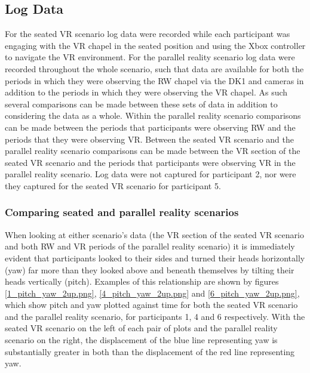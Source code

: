 
\subsection{Log Data}

For the seated VR scenario log data were recorded while each participant was engaging with the VR chapel in the seated position and using the Xbox controller to navigate the VR environment. For the parallel reality scenario log data were recorded throughout the whole scenario, such that data are available for both the periods in which they were observing the RW chapel via the DK1 and cameras in addition to the periods in which they were observing the VR chapel. As such several comparisons can be made between these sets of data in addition to considering the data as a whole. Within the parallel reality scenario comparisons can be made between the periods that participants were observing RW and the periods that they were observing VR. Between the seated VR scenario and the parallel reality scenario comparisons can be made between the VR section of the seated VR scenario and the periods that participants were observing VR in the parallel reality scenario. Log data were not captured for participant 2, nor were they captured for the seated VR scenario for participant 5.


\subsubsection{Comparing seated and parallel reality scenarios}

When looking at either scenario's data (the VR section of the seated VR scenario and both RW and VR periods of the parallel reality scenario) it is immediately evident that participants looked to their sides and turned their heads horizontally (yaw) far more than they looked above and beneath themselves by tilting their heads vertically (pitch). Examples of this relationship are shown by figures \ref{1_pitch_yaw_2up.png}, \ref{4_pitch_yaw_2up.png} and \ref{6_pitch_yaw_2up.png}, which show pitch and yaw plotted against time for both the seated VR scenario and the parallel reality scenario, for participants 1, 4 and 6 respectively. With the seated VR scenario on the left of each pair of plots and the parallel reality scenario on the right, the displacement of the blue line representing yaw is substantially greater in both than the displacement of the red line representing yaw.


